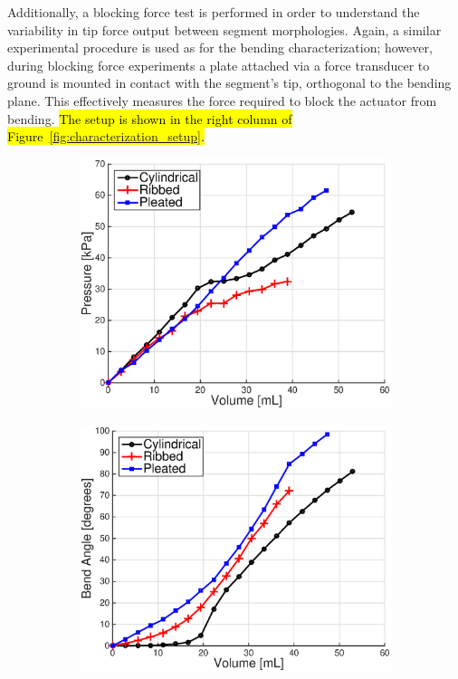 Additionally, a blocking force test is performed in order to understand the variability in tip force output between segment morphologies.
%
Again, a similar experimental procedure is used as for the bending characterization; however, during blocking force experiments a plate attached via a force transducer to ground is mounted in contact with the segment's tip, orthogonal to the bending plane.
%
This effectively measures the force required to block the actuator from bending.
%
\hl{The setup is shown in the right column of Figure~\mbox{\ref{fig:characterization_setup}}.}
%
\begin{figure}[htb]
        \centering
        \begin{subfigure}[b]{0.95\columnwidth}
            \centering
            \includegraphics[width=0.95\columnwidth]{figures/actuators/morphologiescharacterization/PressureVsVolumeColor.eps}
            \caption{}
            \label{fig:Characterization_PressureVsVolume}
        \end{subfigure}
        \begin{subfigure}[b]{0.95\columnwidth}
            \centering
            \includegraphics[width=0.95\columnwidth]{figures/actuators/morphologiescharacterization/BendAngleVsVolumeColor.eps}

\end{subfigure}
\end{figure}
